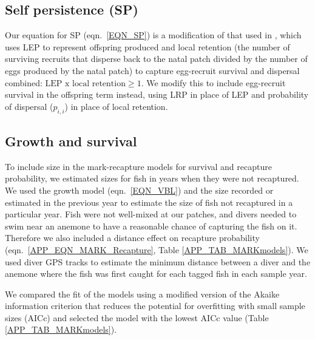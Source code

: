 \documentclass[12pt, oneside]{article}   	%
\begin{document}
\subsection{Self persistence (SP)} \label{APP_SEC_METHODS_SP}

Our equation for SP (eqn.\ \ref{EQN_SP}) is a modification of that used in \cite{burgess2014beyond}, which uses LEP to represent offspring produced and local retention (the number of surviving recruits that disperse back to the natal patch divided by the number of eggs produced by the natal patch) to capture egg-recruit survival and dispersal combined: $\text{LEP } \text{x } \text{local retention} \geq 1$. We modify this to include egg-recruit survival in the offspring term instead, using LRP in place of LEP and probability of dispersal ($p_{i,i}$) in place of local retention.
 

\subsection{Growth and survival} \label{APP_SEC_METHODS_Growth_and_survival}

To include size in the mark-recapture models for survival and recapture probability, we estimated sizes for fish in years when they were not recaptured. We used the growth model (eqn.\ \ref{EQN_VBL}) and the size recorded or estimated in the previous year to estimate the size of fish not recaptured in a particular year. Fish were not well-mixed at our patches, and divers needed to swim near an anemone to have a reasonable chance of capturing the fish on it. Therefore we also included a distance effect on recapture probability (eqn.\ \ref{APP_EQN_MARK_Recapture}, Table \ref{APP_TAB_MARKmodels}). We used diver GPS tracks to estimate the minimum distance between a diver and the anemone where the fish was first caught for each tagged fish in each sample year.

We compared the fit of the models using a modified version of the Akaike information criterion that reduces the potential for overfitting with small sample sizes (AICc) and selected the model with the lowest AICc value (Table \ref{APP_TAB_MARKmodels}).

\end{document}
